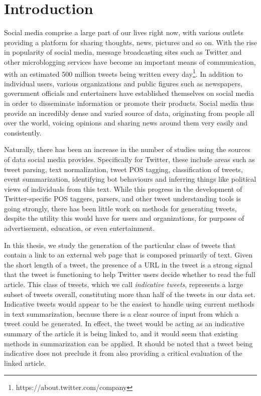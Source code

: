 \chapter{Introduction}
\label{chap:intro}

Social media comprise a large part of our lives right now, with various outlets providing a platform for sharing thoughts, news, pictures and so on. With the rise in popularity of social media, message broadcasting sites such as Twitter and other microblogging services have become an important means of communication, with an estimated 500 million tweets being written every day\footnote{https://about.twitter.com/company}. In addition to individual users, various organizations and public figures such as newspapers, government officials and entertainers have established themselves on social media in order to disseminate information or promote their products. Social media thus provide an incredibly dense and varied source of data, originating from people all over the world, voicing opinions and sharing news around them very easily and consistently.

Naturally, there has been an increase in the number of studies using the sources of data social media provides. Specifically for Twitter, these include areas such as tweet parsing, text normalization, tweet POS tagging, classification of tweets, event summarization, identifying bot behaviours and inferring things like political views of individuals from this text. While this progress in the development of Twitter-specific POS taggers, parsers, and other tweet understanding tools \cite{owoputi-etal-2013,kong-etal-2014} is going strongly, there has been little work on methods for generating tweets, despite the utility this would have for users and organizations, for purposes of advertisement, education, or even entertainment. 

In this thesis, we study the generation of the particular class of tweets that contain a link to an external web page that is composed primarily of text. Given the short length of a tweet, the presence of a URL in the tweet is a strong signal that the tweet is functioning to help Twitter users decide whether to read the full article. This class of tweets, which we call \emph{indicative tweets}, represents a large subset of tweets overall, constituting more than half of the tweets in our data set. Indicative tweets would appear to be the easiest to handle using current methods in text summarization, because there is a clear source of input from which a tweet could be generated. In effect, the tweet would be acting as an indicative summary of the article it is being linked to, and it would seem that existing methods in summarization can be applied. It should be noted that a tweet being indicative does not preclude it from also providing a critical evaluation of the linked article.

